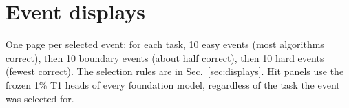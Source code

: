 \documentclass[11pt,a4paper]{article}
\begin{document}
\clearpage
\appendix
{}
\section{Event displays}\label{app:displays}
One page per selected event: for each task, 10 easy events (most algorithms correct), then 10 boundary events (about half correct), then 10 hard events (fewest correct). The selection rules are in Sec.~\ref{sec:displays}. Hit panels use the frozen 1\% T1 heads of every foundation model, regardless of the task the event was selected for.

\restoregeometry
\end{document}

